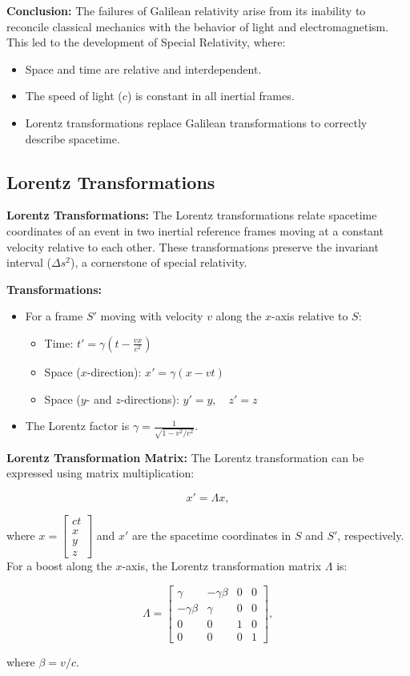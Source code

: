 \documentclass{article}
\newcommand{\eqbox}[1]{\begin{tcolorbox}[colback=gray!10] #1 \end{tcolorbox}}
\newcommand{\conceptbox}[1]{\begin{tcolorbox}[colback=blue!10] #1 \end{tcolorbox}}
\begin{document}
\conceptbox{
\textbf{Conclusion:}
The failures of Galilean relativity arise from its inability to reconcile classical mechanics with the behavior of light and electromagnetism. This led to the development of Special Relativity, where:
\begin{itemize}
    \item Space and time are relative and interdependent.
    \item The speed of light (\( c \)) is constant in all inertial frames.
    \item Lorentz transformations replace Galilean transformations to correctly describe spacetime.
\end{itemize}
}


\subsection{Lorentz Transformations}

\conceptbox{
\textbf{Lorentz Transformations:}
The Lorentz transformations relate spacetime coordinates of an event in two inertial reference frames moving at a constant velocity relative to each other. These transformations preserve the invariant interval (\( \Delta s^2 \)), a cornerstone of special relativity.
}

\conceptbox{
\textbf{Transformations:}
\begin{itemize}
    \item For a frame \( S' \) moving with velocity \( v \) along the \( x \)-axis relative to \( S \):
    \eqbox{
    \begin{itemize}
        \item Time: \( t' = \gamma \left( t - \frac{vx}{c^2} \right) \)
        \item Space (\( x \)-direction): \( x' = \gamma \left( x - vt \right) \)
        \item Space (\( y \)- and \( z \)-directions): \( y' = y, \quad z' = z \)
    \end{itemize}
    }
    \item The Lorentz factor is \( \gamma = \frac{1}{\sqrt{1 - v^2/c^2}} \).
\end{itemize}
}

\conceptbox{
\textbf{Lorentz Transformation Matrix:}
The Lorentz transformation can be expressed using matrix multiplication:
\eqbox{
\[
x' = \Lambda x,
\]
}
where \( x = \begin{bmatrix} ct \\ x \\ y \\ z \end{bmatrix} \) and \( x' \) are the spacetime coordinates in \( S \) and \( S' \), respectively. For a boost along the \( x \)-axis, the Lorentz transformation matrix \( \Lambda \) is:
\eqbox{
\[
\Lambda =
\begin{bmatrix}
\gamma & -\gamma \beta & 0 & 0 \\
-\gamma \beta & \gamma & 0 & 0 \\
0 & 0 & 1 & 0 \\
0 & 0 & 0 & 1
\end{bmatrix},
\]
}
where \( \beta = v/c \).
}
\end{document}

